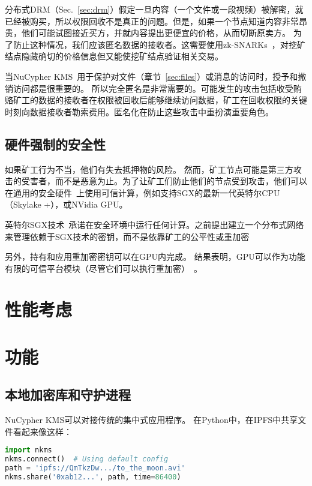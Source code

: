 \documentclass[longbibliography,nofootinbib]{revtex4-1}
\newcommand{\kms}{NuCypher KMS}
\begin{document}
\begin{CJK*}{UTF8}{gbsn}
    分布式DRM（Sec.~\ref{sec:drm}）假定一旦内容（一个文件或一段视频）被解密，就已经被购买，所以权限回收不是真正的问题。但是，如果一个节点知道内容非常昂贵，他们可能试图接近买方，并就内容提出更便宜的价格，从而切断原卖方。 为了防止这种情况，我们应该匿名数据的接收者。这需要使用zk-SNARKs~\cite{consensys-snarks}，对挖矿结点隐藏确切的价格信息但又能使挖矿结点验证相关交易。


    当\kms~用于保护对文件（章节~\ref{sec:files}）或消息的访问时，授予和撤销访问都是很重要的。 所以完全匿名是非常需要的。可能发生的攻击包括收受贿赂矿工的数据的接收者在权限被回收后能够继续访问数据，矿工在回收权限的关键时刻向数据接收者勒索费用。匿名化在防止这些攻击中重扮演重要角色。


\subsection{硬件强制的安全性}

	如果矿工行为不当，他们有失去抵押物的风险。 然而，矿工节点可能是第三方攻击的受害者，而不是恶意为止。为了让矿工们防止他们的节点受到攻击，他们可以在通用的安全硬件~\cite{Yang2011}上使用可信计算，例如支持SGX的最新一代英特尔CPU（Skylake +），或NVidia GPU。
    
    英特尔SGX技术~\cite{wiki:sgx}承诺在安全环境中运行任何计算。之前提出建立一个分布式网络来管理依赖于SGX技术的密钥，而不是依靠矿工的公平性或重加密~\cite{sgx-blockchain-encryption}
    
    另外，持有和应用重加密密钥可以在GPU内完成。 结果表明，GPU可以作为功能有限的可信平台模块（尽管它们可以执行重加密）~\cite{gpu-trusted}。


\section{性能考虑}

\section{功能}

\subsection{本地加密库和守护进程}

NuCypher KMS可以对接传统的集中式应用程序。 在Python中，在IPFS中共享文件看起来像这样：

\begin{lstlisting}[frame=single,language=Python]
import nkms
nkms.connect()  # Using default config
path = 'ipfs://QmTkzDw.../to_the_moon.avi'
nkms.share('0xab12...', path, time=86400)
\end{lstlisting}


\end{CJK*}
\end{document}
